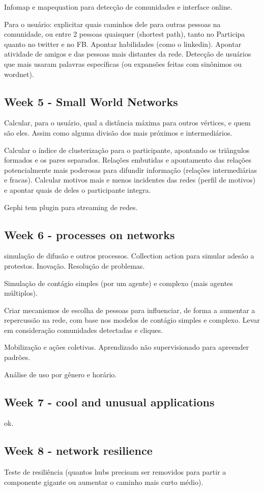 \documentclass[12pt]{report}
\begin{document}
Infomap e mapequation para detecção de comunidades e interface online.

Para o usuário: explicitar quais caminhos dele para outras pessoas na comunidade, ou entre 2 pessoas quaisquer (shortest path), tanto no Participa quanto no twitter e no FB. Apontar habilidades (como o linkedin). Apontar atividade de amigos e das pessoas mais distantes da rede. Detecção de usuários que mais usaram palavras específicas (ou expansões feitas com sinônimos ou wordnet).
\subsection{Week 5 - Small World Networks}
Calcular, para o usuário, qual a distância máxima para outros vértices, e quem são eles. Assim como alguma divisão dos mais próximos e intermediários.

Calcular o índice de clusterização para o participante, apontando os triângulos formados e os pares separados. Relações embutidas e apontamento das relações potencialmente mais poderosas para difundir informação (relações intermediárias e fracas). Calcular motivos mais e menos incidentes das redes (perfil de motivos) e apontar quais de deles o participante integra.

Gephi tem plugin para streaming de redes.
\subsection{Week 6 - processes on networks}
simulação de difusão e outros processos. Collection action para simular adesão a protestos. Inovação. Resolução de problemas.

Simulação de contágio simples (por um agente) e complexo (mais agentes múltiplos).

Criar mecanismos de escolha de pessoas para influenciar, de forma a aumentar a repercussão na rede, com base nos modelos de contágio simples e complexo. Levar em consideração comunidades detectadas e cliques.

Mobilização e ações coletivas. Aprendizado não supervisionado para apreender padrões.

Análise de uso por gênero e horário.
\subsection{Week 7 - cool and unusual applications}
ok.
\subsection{Week 8 - network resilience}
Teste de resiliência (quantos hubs precisam ser removidos para partir a componente gigante ou aumentar o caminho mais curto médio).
\end{document}
